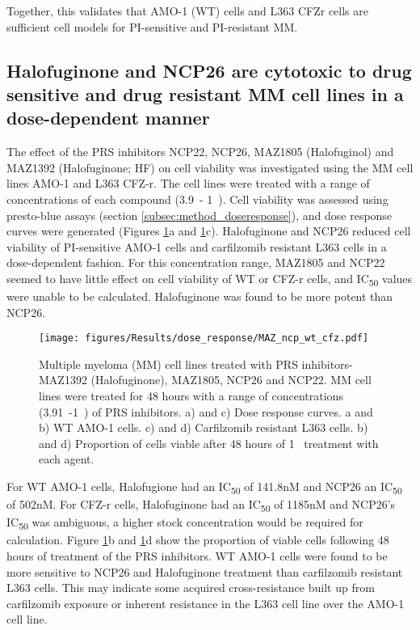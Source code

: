 Together, this validates that AMO-1 (WT) cells and L363 CFZr cells are sufficient cell models for PI-sensitive and PI-resistant MM\@.

\subsection{Halofuginone and NCP26 are cytotoxic to drug sensitive and drug resistant MM cell lines in a dose-dependent manner}
The effect of the PRS inhibitors NCP22, NCP26, MAZ1805 (Halofuginol) and MAZ1392 (Halofuginone; HF) on cell viability was investigated using the MM cell lines AMO-1 and L363 CFZ-r.
The cell lines were treated with a range of concentrations of each compound (3.9\si{\nano\Molar}- 1\si{\micro\Molar}).
Cell viability was assessed using presto-blue assays (section \ref{subsec:method_doseresponse}), and dose response curves were generated (Figures \ref{fig:dose}a and \ref{fig:dose}c).
Halofuginone and NCP26 reduced cell viability of PI-sensitive AMO-1 cells and carfilzomib resistant L363 cells in a dose-dependent fashion.
For this concentration range, MAZ1805 and NCP22 seemed to have little effect on cell viability of WT or CFZ-r cells, and IC\textsubscript{50} values were unable to be calculated.
Halofuginone was found to be more potent than NCP26.
%
\begin{figure}[h]
\centering
\texttt{[image: figures/Results/dose\_response/MAZ\_ncp\_wt\_cfz.pdf]}
\caption[PRS inhibitor dose response curves]{Multiple myeloma (MM) cell lines treated with PRS inhibitors- MAZ1392 (Halofuginone), MAZ1805, NCP26 and NCP22.
MM cell lines were treated for 48 hours with a range of concentrations (3.91\si{\nano\Molar}-1\si{\micro\Molar}) of PRS inhibitors.
a) and c) Dose response curves.
a and b) WT AMO-1 cells.
c) and d) Carfilzomib resistant L363 cells.
b) and d) Proportion of cells viable after 48 hours of 1\si{\micro\Molar} treatment with each agent.}
\label{fig:dose}
\end{figure}

For WT AMO-1 cells, Halofugione had an IC\textsubscript{50} of 141.8nM and NCP26 an IC\textsubscript{50} of 502nM. For CFZ-r cells, Halofuginone had an IC\textsubscript{50} of 1185nM and NCP26's IC\textsubscript{50} was ambiguous, a higher stock concentration would be required for calculation.
Figure \ref{fig:dose}b and \ref{fig:dose}d show the proportion of viable cells following 48 hours of treatment of the PRS inhibitors.
WT AMO-1 cells were found to be more sensitive to NCP26 and Halofuginone treatment than carfilzomib resistant L363 cells.
This may indicate some acquired cross-resistance built up from carfilzomib exposure or inherent resistance in the L363 cell line over the AMO-1 cell line.

